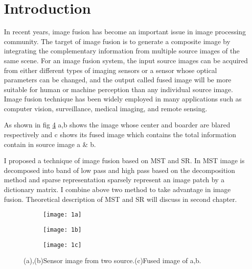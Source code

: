\section{Introduction}
 In recent years, image fusion has become an important issue in
image processing community. The target of image fusion is to generate a composite image by integrating the complementary information from multiple source images of the same scene. For
an image fusion system, the input source images can be acquired
from either different types of imaging sensors or a sensor whose
optical parameters can be changed, and the output called fused
image will be more suitable for human or machine perception than
any individual source image. Image fusion technique has been
widely employed in many applications such as computer vision,
surveillance, medical imaging, and remote sensing.
\hfill \break

 As shown in fig \ref{fig1} a,b shows the image whose center and boarder are blared respectively and c shows its fused image which contains the total information contain in source image a \& b.
\hfill \break

 I proposed a technique of image fusion based on MST and SR. In MST image is decomposed into band of low pass and high pass based on the decomposition method and sparse representation sparsely represent an image patch by a dictionary matrix. I combine above two method to take advantage in image fusion. Theoretical description of MST and SR will discuss in second chapter.

\begin{figure}[ht] 
  \begin{subfigure}[b]{0.33\linewidth}
    \centering
    \texttt{[image: 1a]}
    \caption{} 
    \label{1a} 
    \vspace{4ex}
  \end{subfigure}%
  \begin{subfigure}[b]{0.33\linewidth}
    \centering
    \texttt{[image: 1b]}
    \caption{} 
    \label{1b} 
    \vspace{4ex}
  \end{subfigure}%
  \begin{subfigure}[b]{0.33\linewidth}
    \centering
    \texttt{[image: 1c]} 
    \caption{} 
    \label{1c} 
    \vspace{4ex}
  \end{subfigure}%
  
  \caption{(a),(b)Sensor image from two source.(c)Fused image of a,b.}
  \label{fig1} 
\end{figure}

